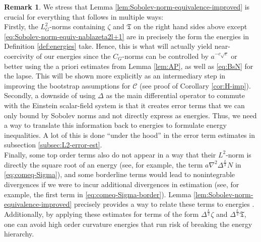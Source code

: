 \documentclass[11pt,leqno,textwidth=10cm]{amsart}
\numberwithin{equation}{section}
\theoremstyle{definition}
\newtheorem{remark}[definition]{Remark}
\theoremstyle{plain}
\newcommand{\1}{\mathbbm{1}}
\renewcommand{\epsilon}{\varepsilon}
\newcommand{\Lap}{\Delta}
\newcommand{\change}[1]{\color{black}#1\color{black}}
\newcommand{\delete}[1]{}
\begin{document}
\begin{remark}\label{rem:Sobolev-norm-equivalence-improved}
We stress that Lemma \ref{lem:Sobolev-norm-equivalence-improved} is crucial for everything that follows in multiple ways:\\

Firstly, the $L^2_G$-norms containing $\zeta$ and $\mathfrak{T}$ on the right hand sides \delete{of all inequalities }above except \eqref{eq:Sobolev-norm-equiv-nablazeta2l+1} are in precisely the form the energies in Definition \ref{def:energies} take. Hence, this is what will actually yield near-coercivity of \change{our energies since the $C_G$-norms can be controlled by $a^{-c\sqrt{\epsilon}}$ or better using the a priori estimates from Lemma \ref{lem:AP}, as well as \eqref{eq:BsN} for the lapse.} This will be shown more \change{explicitly }as an intermediary step in improving the bootstrap assumptions for $\mathcal{C}$ (see proof of Corollary \ref{cor:H-imp}).\\

Secondly, a downside of using $\Lap$ as the main differential operator to commute with the Einstein scalar-field system is that it creates error terms that we can only bound by Sobolev norms and not directly express as energies. Thus, we need a way to translate this information back to energies to formulate energy inequalities. A lot of this is done \enquote{under the hood} in the error term estimates in subsection \ref{subsec:L2-error-est}.\\

Finally, some top order terms also do not appear in a way that their $L^2$-norm is directly the square root of an energy (see, for example, the term $a\nabla^2\Lap^{\frac{L}2}N$ in \eqref{eq:comeq-Sigma}), and some borderline terms would lead to nonintegrable divergences \delete{at that level of derivatives }if we were to incur additional divergences in estimation (see, for example, the first term in \eqref{eq:comeq-Sigma-border}). Lemma \ref{lem:Sobolev-norm-equivalence-improved} precisely provides a way to relate these terms to energies \delete{without losing precision at top order in terms of powers of $a$}. Additionally, by applying these estimates for terms of the form $\Lap^\frac{L}2\zeta$ and $\Lap^\frac{L}2\mathfrak{T}$, one can avoid high order curvature energies \change{that run risk of breaking the energy hierarchy.}
\end{remark}
\end{document}

